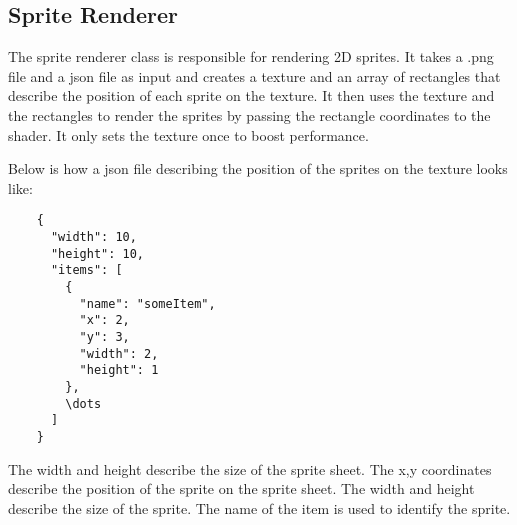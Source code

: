 \subsection{Sprite Renderer}

The sprite renderer class is responsible for rendering 2D sprites.
It takes a .png file and a json file as input and creates a texture and an array of rectangles that describe the position of each sprite on the texture.
It then uses the texture and the rectangles to render the sprites by passing the rectangle coordinates to the shader.
It only sets the texture once to boost performance.

Below is how a json file describing the position of the sprites on the texture looks like:

\begin{verbatim}
    {
      "width": 10,
      "height": 10,
      "items": [
        {
          "name": "someItem",
          "x": 2,
          "y": 3,
          "width": 2,
          "height": 1
        },
        \dots
      ]
    }
\end{verbatim}
    

The width and height describe the size of the sprite sheet.
The x,y coordinates describe the position of the sprite on the sprite sheet.
The width and height describe the size of the sprite.
The name of the item is used to identify the sprite.